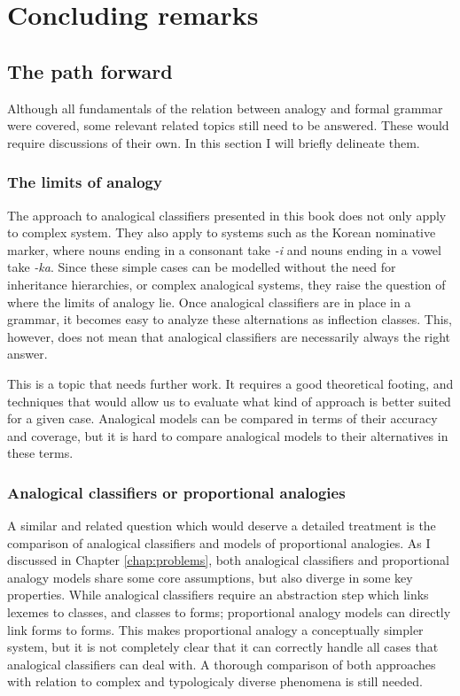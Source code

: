 \chapter{Concluding remarks}\label{chap:conclusion}

\section{The path forward}

Although all fundamentals of the relation between analogy and formal grammar were covered, some relevant related topics still need to be answered. These would require discussions of their own. In this section I will briefly delineate them.

\subsection{The limits of analogy}

The approach to analogical classifiers presented in this book does not only apply to complex system.
They also apply to systems such as the Korean nominative marker, where nouns ending in a consonant take \textit{-i} and nouns ending in a vowel take \textit{-ka}.
Since these simple cases can be modelled without the need for inheritance hierarchies, or complex analogical systems, they raise the question of where the limits of analogy lie.
Once analogical classifiers are in place in a grammar, it becomes easy to analyze these alternations as inflection classes.
This, however, does not mean that analogical classifiers are necessarily always the right answer.

This is a topic that needs further work.
It requires a good theoretical footing, and techniques that would allow us to evaluate what kind of approach is better suited for a given case.
Analogical models can be compared in terms of their accuracy and coverage, but it is hard to compare analogical models to their alternatives in these terms.

\subsection{Analogical classifiers or proportional analogies}

A similar and related question which would deserve a detailed treatment is the comparison of analogical classifiers and models of proportional analogies.
As I discussed in Chapter \ref{chap:problems}, both analogical classifiers and proportional analogy models share some core assumptions, but also diverge in some key properties. While analogical classifiers require an abstraction step which links lexemes to classes, and classes to forms; proportional analogy models can directly link forms to forms. This makes proportional analogy a conceptually simpler system, but it is not completely clear that it can correctly handle all cases that analogical classifiers can deal with. A thorough comparison of both approaches with relation to complex and typologicaly diverse phenomena is still needed.

